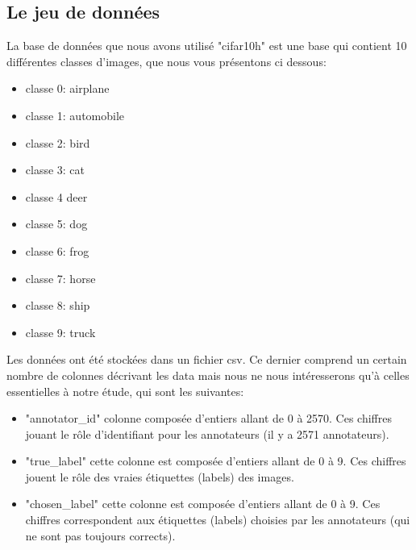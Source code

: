 \documentclass[a4paper,french,10pt]{article}
\begin{document}
	
	\subsection{Le jeu de données}
	La base de données que nous avons utilisé "cifar10h" est une base qui contient 10 différentes classes d'images, que nous vous présentons ci dessous:
	\begin{itemize}
		\item classe 0: airplane \\
		\item classe 1: automobile \\
		\item classe 2: bird \\
		\item classe 3: cat \\
		\item classe 4 deer \\
		\item classe 5: dog \\
		\item classe 6: frog \\
		\item classe 7: horse \\
		\item classe 8: ship \\
		\item classe 9: truck
		
	\end{itemize}
	
	\vspace{2mm}
	
	Les données ont été stockées dans un fichier csv. Ce dernier comprend un certain nombre de colonnes décrivant les data mais nous ne nous intéresserons qu'à celles essentielles à notre étude, qui sont les suivantes:
	\begin{itemize}
		\item "annotator\_id" colonne composée d'entiers allant de 0 à 2570. Ces chiffres jouant le rôle d'identifiant pour les annotateurs (il y a 2571 annotateurs). \\
		\item "true\_label" cette colonne est composée d'entiers allant de 0 à 9. Ces chiffres jouent le rôle des vraies étiquettes (labels) des images. \\
		\item "chosen\_label" cette colonne est composée d'entiers allant de 0 à 9. Ces chiffres correspondent aux étiquettes (labels) choisies par les annotateurs (qui ne sont pas toujours corrects).
	\end{itemize}
\end{document}
